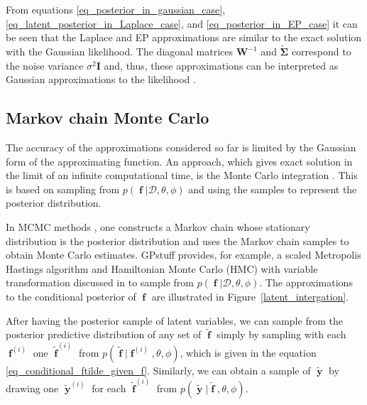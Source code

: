 \documentclass[twoside,11pt]{article}
\DeclareMathOperator{\f}{\mathbf{f}}
\DeclareMathOperator{\y}{\mathbf{y}}
\newcommand{\mb}{\mathbf}
\newcommand{\pkg}[1]{{\fontseries{b}\selectfont #1}}
\begin{document}
From equations \eqref{eq_posterior_in_gaussian_case},
\eqref{eq_latent_posterior_in_Laplace_case}, and
\eqref{eq_posterior_in_EP_case} it can be seen that the Laplace and EP
approximations are similar to the exact solution with the Gaussian
likelihood. The diagonal matrices $\mb{W}^{-1}$ and
$\mb{\tilde{\Sigma}}$ correspond to the noise variance
$\sigma^2\mb{I}$ and, thus, these approximations can be interpreted as
Gaussian approximations to the likelihood
\citep{Nickisch+Rasmussen:2008}.


\subsection{Markov chain Monte
  Carlo}\label{sec_MCMC_for_conditional_of_latents}

The accuracy of the approximations considered so far is limited by
the Gaussian form of the approximating function. An approach, which
gives exact solution in the limit of an infinite computational time,
is the Monte Carlo integration \citep{Robert+Casella:2004}. This is
based on sampling from $p(\f|\mathcal{D}, \theta, \phi)$ and using the
samples to represent the posterior distribution. 

In MCMC methods \citep{Gilks+Richardson+Spiegelhalter:1996}, one
constructs a Markov chain whose stationary distribution is the
posterior distribution and uses the Markov chain samples to obtain
Monte Carlo estimates. \pkg{GPstuff} provides, for example, a scaled
Metropolis Hastings algorithm \citep{Neal:1998} and Hamiltonian Monte
Carlo (HMC) \citep{Duane+Kennedy+Pendleton+Roweth:1987,Neal:1996a}
with variable transformation discussed in
\citep{Christensen+Roberts+Skold:2006,Vanhatalo+Vehtari:2007} to
sample from $p(\f|\mathcal{D}, \theta, \phi)$. The approximations to
the conditional posterior of $\f$ are illustrated in
Figure~\ref{latent_intergation}.

After having the posterior sample of latent variables, we can sample
from the posterior predictive distribution of any set of $\tilde{\f}$
simply by sampling with each $\f^{(i)}$ one $\tilde{\f}^{(i)}$ from
$p(\tilde{\f}|\f^{(i)},\theta,\phi)$, which is given in the equation
\eqref{eq_conditional_ftilde_given_f}. Similarly, we can obtain a
sample of $\tilde{\y}$ by drawing one $\tilde{\y}^{(i)}$ for each
$\tilde{\f}^{(i)}$ from $p(\tilde{\y}|\tilde{\f},\theta, \phi)$.
\end{document}
